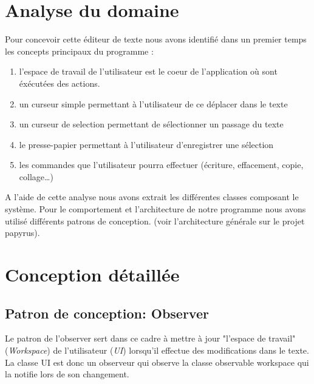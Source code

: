 \documentclass[pdftex,12pt,a4paper]{article}
\begin{document}
        

    	\section{Analyse du domaine}
    Pour concevoir cette éditeur de texte nous avons identifié dans un premier temps les concepts principaux du programme :
    
    	\begin{enumerate}
        	\item  l'espace de travail de l'utilisateur est le coeur de l'application où sont éxécutées des actions.
            \item  un curseur simple permettant à l'utilisateur de ce déplacer dans le texte 
            \item un curseur de selection permettant de sélectionner un passage du texte
            \item le presse-papier permettant à l'utilisateur d'enregistrer une sélection 
            \item les commandes que l'utilisateur pourra effectuer (écriture, effacement, copie, collage\dots) \\
        
        \end{enumerate} 
       
  A l'aide de cette analyse nous avons extrait les différentes classes composant le système. Pour le comportement et l'architecture de notre programme nous avons utilisé différents patrons de conception. (voir l'architecture générale sur le projet papyrus).
        \newpage
         
         \section{Conception détaillée}
 
   \subsection{Patron de conception: Observer} 
      Le patron de l'observer sert dans ce cadre à mettre à jour "l'espace de travail" (\emph{Workspace}) de l'utilisateur (\emph{UI}) lorsqu'il effectue des modifications dans le texte. La classe UI est donc un observeur qui observe la classe  observable workspace qui la notifie lors de son changement.\\
      
\end{document}
